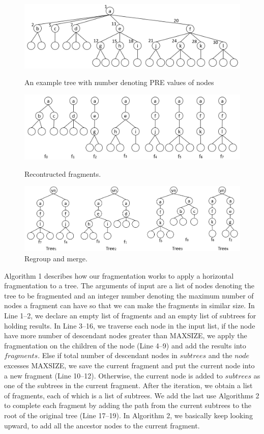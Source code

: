 \begin{figure}[!t] 
	\includegraphics[scale=0.38]{basex/figures/fragment1}
	\caption{An example tree with number denoting PRE values of nodes}
	\label{fig:frag1}
	\includegraphics[scale=0.38]{basex/figures/fragment2}
	\caption{Recontructed fragments.}
	\label{fig:frag2}
	\includegraphics[scale=0.35]{basex/figures/fragment3}
	\caption{Regroup and merge.}
	\label{fig:frag3}
\end{figure}



Algorithm 1 describes how our fragmentation works to apply a horizontal
fragmentation to a tree. The arguments of input are a list of nodes denoting the
tree to be fragmented and an integer number denoting the maximum number of nodes
a fragment can have so that we can make the fragments in similar size.   In Line
1--2, we declare an empty list of fragments and an empty list of subtrees for
holding results. In Line 3--16, we traverse each node in the input list, if the
node have more number of descendant nodes greater than MAXSIZE, we apply the
fragmentation on the children of the node (Line 4--9) and add the results into
$fragments$. Else if total number of descendant nodes in $subtrees$ and the
$node$ excesses MAXSIZE, we save the current fragment and put the current node
into a new fragment (Line 10--12). Otherwise, the current node is added to
$subtrees$ as one of the subtrees in the current fragment. After the iteration,
we obtain a list of fragments, each of which is a list of subtrees. We add the
last use Algorithms 2 to complete each fragment by adding the path from the
current subtrees to the root of the original tree (Line 17--19). In Algorithm 2,
we basically keep looking upward, to add all the ancestor nodes to the current
fragment.

